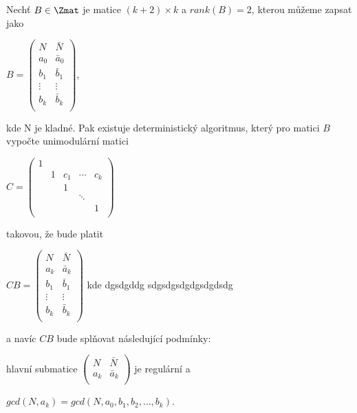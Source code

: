 \begin{vet}
    Nechť $ B \in \Zmat $ je matice $ (k+2) \times k $ a $ rank(B) = 2 $, kterou
    můžeme zapsat jako
\begin{center}
$ B =
    \begin{pmatrix}
        N & \bar{N} \\
        a_0 & \bar{a}_0  \\
        b_1 & \bar{b}_1  \\
        \vdots & \vdots  \\
        b_k & \bar{b}_k  \\
    \end{pmatrix}
$,
\end{center}
kde N je kladné.
Pak existuje deterministický algoritmus, který pro matici $ B $ vypočte unimodulární
matici
\begin{center}
$ C =
    \begin{pmatrix}
        1 &    &     &        &     \\
          & 1  & c_1 & \cdots & c_k \\
          &    & 1   &        &     \\
          &    &     & \ddots &     \\
          &    &     &        & 1   \\
    \end{pmatrix}
$
\end{center}
takovou, že bude platit
\begin{center}
$ CB =
    \begin{pmatrix}
        N & \bar{N} \\
        a_k & \bar{a}_k  \\
        b_1 & \bar{b}_1  \\
        \vdots & \vdots  \\
        b_k & \bar{b}_k  \\
    \end{pmatrix}
$ kde dgsdgddg
sdgsdgsdgdgsdgdsdg
\end{center}
a navíc $ CB $ bude splňovat následující podmínky:
\begin{Cond}
    \item hlavní submatice
    $
        \begin{pmatrix}
            N & \bar{N} \\
            a_k & \bar{a}_k  \\
        \end{pmatrix}
    $ je regulární a
    \item $ gcd(N, a_k) = gcd(N, a_0, b_1, b_2, \dots, b_k) $.
\end{Cond}
\end{vet}

